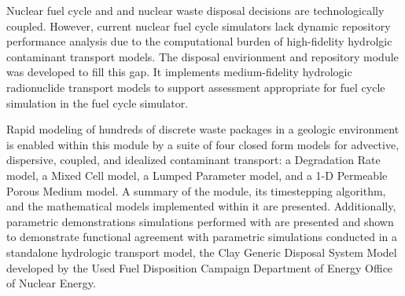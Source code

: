 Nuclear fuel cycle and and nuclear waste disposal decisions are
technologically coupled.  However, current nuclear fuel cycle simulators lack dynamic
repository performance analysis due to the computational burden of
high-fidelity hydrolgic contaminant transport models. The \Cyder disposal 
envirionment and repository module was developed to fill this gap. It implements medium-fidelity hydrologic 
radionuclide transport models to support assessment appropriate for fuel
cycle simulation in the \Cyclus fuel cycle simulator. 

Rapid modeling of hundreds of discrete waste packages in a geologic environment 
is enabled within this module by a suite of four closed form models for 
advective, dispersive, coupled, and idealized contaminant transport: a 
Degradation Rate model, a Mixed Cell model, a Lumped Parameter model, and a 1-D 
Permeable Porous Medium model.  A summary of the \Cyder module, its 
timestepping algorithm, and the mathematical models implemented within it are 
presented. Additionally, parametric demonstrations simulations performed with 
\Cyder are presented and shown to demonstrate functional agreement with parametric 
simulations conducted in a standalone hydrologic transport model, the Clay 
Generic Disposal System Model developed by the Used Fuel Disposition Campaign 
Department of Energy Office of Nuclear Energy. 


